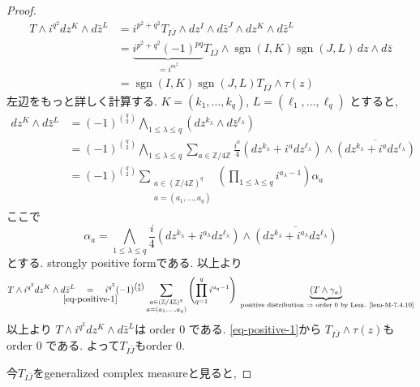 \begin{proof}
\begin{align*}
T\wedge i^{q^2}dz^K\wedge d\bar z^L
&= i^{p^2+q^2}T_{I\bar J}\wedge dz^I\wedge d\bar z^J\wedge dz^K\wedge d\bar z^L \\
&= \underbrace{i^{p^2+q^2}(-1)^{pq}}_{=i^{m^2}}T_{I\bar J}\wedge \operatorname{sgn}(I,K)\operatorname{sgn}(J,L)\,dz\wedge d\bar z \\
&= \operatorname{sgn}(I,K)\operatorname{sgn}(J,L)T_{I\bar J}\wedge \tau(z)
\end{align*}
左辺をもっと詳しく計算する. $K=(k_1,\ldots,k_q)$, $L=(\ell_1,\ldots,\ell_q)$ とすると, 
\begin{equation}
\label{eq-positive-2}
\begin{aligned}
dz^K\wedge d\bar z^L
&= (-1)^{\binom{q}{2}}\bigwedge_{1\leq \lambda\leq q}\left(dz^{k_\lambda}\wedge d\bar z^{\ell_\lambda}\right) \\
&= (-1)^{\binom{q}{2}}\bigwedge_{1\leq \lambda\leq q}\sum_{a\in \mathbb{Z}/4\mathbb{Z}}\frac{i^a}{4}\left(dz^{k_\lambda}+i^a dz^{\ell_\lambda}\right)\wedge
\overline{\left(d z^{k_\lambda}+i^a d z^{\ell_\lambda}\right)} \\
&= (-1)^{\binom{q}{2}}\sum_{\substack{a\in(\mathbb{Z}/4\mathbb{Z})^q\\ a=(a_1,\ldots,a_q)}}\left(\prod_{1\leq \lambda\leq q}i^{a_\lambda-1}\right)\alpha_a
\end{aligned}
\end{equation}
ここで
\begin{equation*}
\alpha_a=\bigwedge_{1\leq \lambda\leq q}\frac{i}{4}\left(dz^{k_\lambda}+i^{a_\lambda}dz^{\ell_\lambda}\right)\wedge
\overline{\left(d z^{k_\lambda}+i^{a_\lambda}d  z^{\ell_\lambda}\right)}
\end{equation*}
とする. strongly positive formである. 
以上より
\begin{equation}
\label{eq-positive-3}
T\wedge i^{q^2}dz^K\wedge d\bar z^L
\underalign{\eqref{eq-positive-1}}{=} i^{q^2}(-1)^{\binom{q}{2}}
\sum_{\substack{a\in(\mathbb{Z}/4\mathbb{Z})^q\\ a=(a_1,\ldots,a_q)}}
\left(\prod_{q=1}^{q} i^{a_q-1}\right)
\underbrace{(T\wedge \gamma_a)}_{\text{ positive distribution $\Rightarrow $ order 0 by Lem. \ref{lem-M-7.4.10}}}
\end{equation}
以上より
$T\wedge i^{q^2}dz^K\wedge d\bar z^L$は order 0
である. \eqref{eq-positive-1}から
$T_{I\bar J}\wedge \tau(z)$もorder 0 である. 
よって$ T_{I\bar J}$もorder 0.

今$T_{I\bar J}$をgeneralized complex measureと見ると, 


\end{proof}
